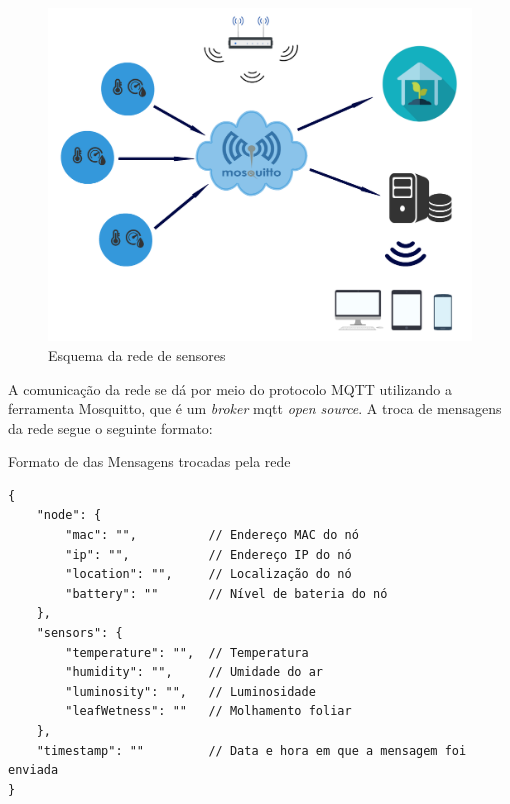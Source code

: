 \begin{figure}[H]
\centering
\includegraphics[scale=0.3]{./04-figuras/rede.png}
\caption{Esquema da rede de sensores}
\vspace{-\baselineskip}
\label{fig:esquema-rede}
\end{figure}

A comunicação da rede se dá por meio do protocolo MQTT utilizando a ferramenta Mosquitto, que é um \textit{broker} mqtt \textit{open source}. A troca de mensagens da rede segue o seguinte formato:

\begin{table}[H]
\centering
\caption{Formato de das Mensagens trocadas pela rede}
\vspace{-\baselineskip}
\begin{verbatim}
{
    "node": {
        "mac": "",          // Endereço MAC do nó
        "ip": "",           // Endereço IP do nó
        "location": "",     // Localização do nó
        "battery": ""       // Nível de bateria do nó
    },
    "sensors": {
        "temperature": "",  // Temperatura
        "humidity": "",     // Umidade do ar 
        "luminosity": "",   // Luminosidade 
        "leafWetness": ""   // Molhamento foliar
    },
    "timestamp": ""         // Data e hora em que a mensagem foi enviada
}
\end{verbatim}
\label{tab:formato-mensagens}
\vspace{-1.2cm}
\end{table}


